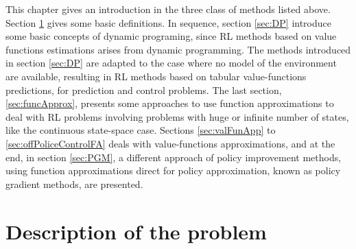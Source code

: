 This chapter gives an introduction in the three class of methods listed above.
Section \ref{sec:description} gives some basic definitions. In sequence, section \ref{sec:DP} introduce some basic concepts of dynamic programing, since RL methods based on value functions estimations arises from dynamic programming. The methods introduced in section \ref{sec:DP} are adapted to the case where no model of the environment are available, resulting in RL methods based on tabular value-functions predictions, for prediction and control problems. The last section, \ref{sec:funcApprox}, presents some approaches to use function approximations to deal with RL problems involving problems with huge  or infinite number of states, like the continuous state-space case.  Sections \ref{sec:valFunApp} to \ref{sec:offPoliceControlFA} deals with value-functions approximations, and at the end, in section \ref{sec:PGM}, a different approach of policy improvement methods, using function approximations direct for policy approximation, known as policy gradient methods, are presented.



\section{Description of the problem} 
\label{sec:description}

